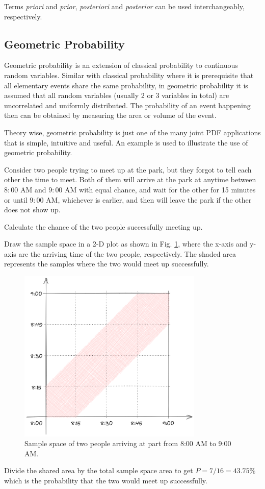 Terms \textit{priori} and \textit{prior}, \textit{posteriori} and \textit{posterior} can be used interchangeably, respectively.

\subsection{Geometric Probability}

Geometric probability is an extension of classical probability to continuous random variables. Similar with classical probability where it is prerequisite that all elementary events share the same probability, in geometric probability it is assumed that all random variables (usually 2 or 3 variables in total) are uncorrelated and uniformly distributed. The probability of an event happening then can be obtained by measuring the area or volume of the event.

Theory wise, geometric probability is just one of the many joint PDF applications that is simple, intuitive and useful. An example is used to illustrate the use of geometric probability.

\begin{shortbox}
Consider two people trying to meet up at the park, but they forgot to tell each other the time to meet. Both of them will arrive at the park at anytime between $8:00$ AM and $9:00$ AM with equal chance, and wait for the other for 15 minutes or until $9:00$ AM, whichever is earlier, and then will leave the park if the other does not show up.

Calculate the chance of the two people successfully meeting up.
\end{shortbox}

Draw the sample space in a 2-D plot as shown in Fig. \ref{fig:geometricprobexp}, where the x-axis and y-axis are the arriving time of the two people, respectively. The shaded area represents the samples where the two would meet up successfully.
\begin{figure}
	\centering
	\includegraphics[width=250pt]{chapters/ch-random-variables/figures/geometricprobexp.png}
	\caption{Sample space of two people arriving at part from 8:00 AM to 9:00 AM.} \label{fig:geometricprobexp}
\end{figure}
Divide the shared area by the total sample space area to get $P=7/16=43.75\%$ which is the probability that the two would meet up successfully.

